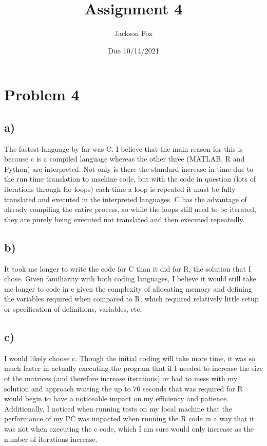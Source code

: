 \documentclass[11pt, oneside]{article}   	%
\title{Assignment 4}
\author{Jackson Fox}
\date{Due 10/14/2021}							%
\begin{document}
\maketitle
\section*{Problem 4}
\subsection*{a)}
The fastest language by far was C.  I believe that the main reason for this is because c is a compiled language whereas the other three (MATLAB, R and Python)  are interpreted.  Not only is there the standard increase in time due to the run time translation to machine code, but with the code in question (lots of iterations through for loops) each time a loop is repeated it must be fully translated and executed in the interpreted languages.  C has the advantage of already compiling the entire process, so while the loops still need to be iterated, they are purely being executed not translated and then executed repeatedly.

\subsection*{b)}
It took me longer to write the code for C than it did for R, the solution that I chose.  Given familiarity with both coding languages, I believe it would still take me longer to code in c given the complexity of allocating memory and defining the variables required when compared to R, which required relatively little setup or specification of definitions, variables, etc.

\subsection*{c)}
I would likely choose c.  Though the initial coding will take more time, it was so much faster in actually executing the program that if I needed to increase the size of the matrices (and therefore increase iterations) or had to mess with my solution and approach waiting the up to 70 seconds that was required for R  would begin to have a noticeable impact on my efficiency and patience.  Additionally, I noticed when running tests on my local machine that the performance of my PC was impacted when running the R code in a way that it was not when executing the c code, which I am sure would only increase as the number of iterations increase.
\end{document}
